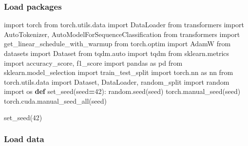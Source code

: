 \documentclass[
]{article}
\newenvironment{Shaded}{\begin{snugshade}}{\end{snugshade}}
\newcommand{\DecValTok}[1]{\textcolor[rgb]{0.00,0.00,0.81}{#1}}
\newcommand{\ImportTok}[1]{#1}
\newcommand{\KeywordTok}[1]{\textcolor[rgb]{0.13,0.29,0.53}{\textbf{#1}}}
\newcommand{\NormalTok}[1]{#1}
\newcommand{\OperatorTok}[1]{\textcolor[rgb]{0.81,0.36,0.00}{\textbf{#1}}}
\begin{document}
\subsubsection{Load packages}\label{load-packages}

\begin{Shaded}
\begin{Highlighting}[]
\ImportTok{import}\NormalTok{ torch}
\ImportTok{from}\NormalTok{ torch.utils.data }\ImportTok{import}\NormalTok{ DataLoader}
\ImportTok{from}\NormalTok{ transformers }\ImportTok{import}\NormalTok{ AutoTokenizer, AutoModelForSequenceClassification}
\ImportTok{from}\NormalTok{ transformers }\ImportTok{import}\NormalTok{ get\_linear\_schedule\_with\_warmup}
\ImportTok{from}\NormalTok{ torch.optim }\ImportTok{import}\NormalTok{ AdamW}
\ImportTok{from}\NormalTok{ datasets }\ImportTok{import}\NormalTok{ Dataset}
\ImportTok{from}\NormalTok{ tqdm.auto }\ImportTok{import}\NormalTok{ tqdm}
\ImportTok{from}\NormalTok{ sklearn.metrics }\ImportTok{import}\NormalTok{ accuracy\_score, f1\_score}
\ImportTok{import}\NormalTok{ pandas }\ImportTok{as}\NormalTok{ pd}
\ImportTok{from}\NormalTok{ sklearn.model\_selection }\ImportTok{import}\NormalTok{ train\_test\_split}
\ImportTok{import}\NormalTok{ torch.nn }\ImportTok{as}\NormalTok{ nn}
\ImportTok{from}\NormalTok{ torch.utils.data }\ImportTok{import}\NormalTok{ Dataset, DataLoader, random\_split}
\ImportTok{import}\NormalTok{ random}
\ImportTok{import}\NormalTok{ os}
\KeywordTok{def}\NormalTok{ set\_seed(seed}\OperatorTok{=}\DecValTok{42}\NormalTok{):}
\NormalTok{    random.seed(seed)}
\NormalTok{    torch.manual\_seed(seed)}
\NormalTok{    torch.cuda.manual\_seed\_all(seed)}

\NormalTok{set\_seed(}\DecValTok{42}\NormalTok{)}
\end{Highlighting}
\end{Shaded}

\subsubsection{Load data}\label{load-data}
\end{document}
